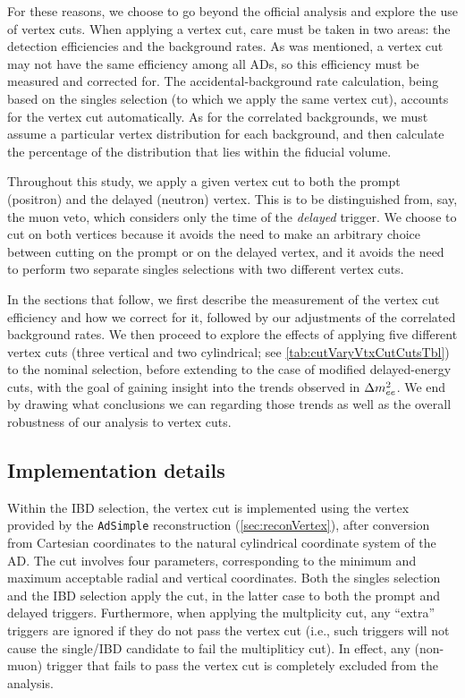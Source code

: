 \documentclass[../thesis.tex]{subfiles}
\begin{document}
For these reasons, we choose to go beyond the official analysis and explore the use of vertex cuts. When applying a vertex cut, care must be taken in two areas: the detection efficiencies and the background rates. As was mentioned, a vertex cut may not have the same efficiency among all ADs, so this efficiency must be measured and corrected for. The accidental-background rate calculation, being based on the singles selection (to which we apply the same vertex cut), accounts for the vertex cut automatically. As for the correlated backgrounds, we must assume a particular vertex distribution for each background, and then calculate the percentage of the distribution that lies within the fiducial volume.

Throughout this study, we apply a given vertex cut to both the prompt (positron) and the delayed (neutron) vertex. This is to be distinguished from, say, the muon veto, which considers only the time of the \emph{delayed} trigger. We choose to cut on both vertices because it avoids the need to make an arbitrary choice between cutting on the prompt or on the delayed vertex, and it avoids the need to perform two separate singles selections with two different vertex cuts.

In the sections that follow, we first describe the measurement of the vertex cut efficiency and how we correct for it, followed by our adjustments of the correlated background rates. We then proceed to explore the effects of applying five different vertex cuts (three vertical and two cylindrical; see \autoref{tab:cutVaryVtxCutCutsTbl}) to the nominal selection, before extending to the case of modified delayed-energy cuts, with the goal of gaining insight into the trends observed in $\Delta m^2_{ee}$. We end by drawing what conclusions we can regarding those trends as well as the overall robustness of our analysis to vertex cuts.

\subsection{Implementation details}
\label{sec:cutVaryVtxCutImplDet}

Within the IBD selection, the vertex cut is implemented using the vertex provided by the \texttt{AdSimple} reconstruction (\autoref{sec:reconVertex}), after conversion from Cartesian coordinates to the natural cylindrical coordinate system of the AD. The cut involves four parameters, corresponding to the minimum and maximum acceptable radial and vertical coordinates. Both the singles selection and the IBD selection apply the cut, in the latter case to both the prompt and delayed triggers. Furthermore, when applying the multplicity cut, any ``extra'' triggers are ignored if they do not pass the vertex cut (i.e., such triggers will not cause the single/IBD candidate to fail the multipliticy cut). In effect, any (non-muon) trigger that fails to pass the vertex cut is completely excluded from the analysis.
\end{document}
